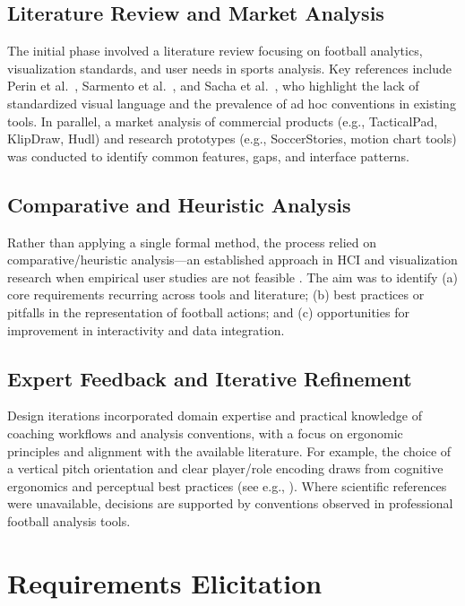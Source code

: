 \documentclass[11pt,a4paper,openright]{report}
\begin{document}
\subsection{Literature Review and Market Analysis}

The initial phase involved a literature review focusing on football analytics, visualization standards, and user needs in sports analysis. Key references include Perin et al.\ \cite{perin2013soccerstories}, Sarmento et al.\ \cite{sarmento2014match}, and Sacha et al.\ \cite{sacha2014feature}, who highlight the lack of standardized visual language and the prevalence of ad hoc conventions in existing tools. In parallel, a market analysis of commercial products (e.g., TacticalPad, KlipDraw, Hudl) and research prototypes (e.g., SoccerStories, motion chart tools) was conducted to identify common features, gaps, and interface patterns.

\subsection{Comparative and Heuristic Analysis}

Rather than applying a single formal method, the process relied on comparative/heuristic analysis---an established approach in HCI and visualization research when empirical user studies are not feasible \cite{munzner2014visualization}. The aim was to identify (a) core requirements recurring across tools and literature; (b) best practices or pitfalls in the representation of football actions; and (c) opportunities for improvement in interactivity and data integration.

\subsection{Expert Feedback and Iterative Refinement}

Design iterations incorporated domain expertise and practical knowledge of coaching workflows and analysis conventions, with a focus on ergonomic principles and alignment with the available literature. For example, the choice of a vertical pitch orientation and clear player/role encoding draws from cognitive ergonomics and perceptual best practices (see e.g., \cite{perin2013soccerstories, munzner2014visualization}). Where scientific references were unavailable, decisions are supported by conventions observed in professional football analysis tools.


\section{Requirements Elicitation}
\end{document}
